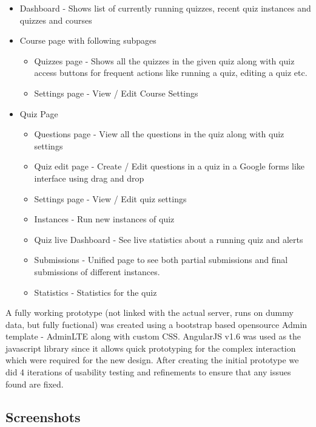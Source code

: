     \begin{itemize}
        \item Dashboard - Shows list of currently running quizzes, recent quiz instances and quizzes and courses
	    \item Course page with following subpages
	    \begin{itemize}
	        \item Quizzes page - Shows all the quizzes in the given quiz along with quiz access buttons for frequent actions like running a quiz, editing a quiz etc.
		    \item Settings page - View / Edit Course Settings
	    \end{itemize}
		
	    \item Quiz Page
	    \begin{itemize}
	        \item Questions page - View all the questions in the quiz along with quiz settings
		    \item Quiz edit page - Create / Edit questions in a quiz in a Google forms like interface using drag and drop
		    \item Settings page - View / Edit quiz settings
		    \item Instances - Run new instances of quiz
		    \item Quiz live Dashboard - See live statistics about a running quiz and alerts
		    \item Submissions - Unified page to see both partial submissions and final submissions of different instances. 
		    \item Statistics - Statistics for the quiz
	    \end{itemize}
	\end{itemize}

	A fully working prototype (not linked with the actual server, runs on dummy data, but fully fuctional) was created using a bootstrap based opensource Admin template - AdminLTE along with custom CSS. AngularJS v1.6 was used as the javascript library since it allows quick prototyping for the complex interaction which were required for the new design. After creating the initial prototype we did 4 iterations of usability testing and refinements to ensure that any issues found are fixed.
 
\subsection{Screenshots}

